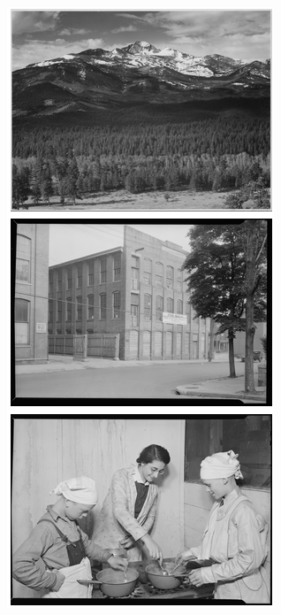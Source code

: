 \begin{enumerate}
\begin{figure}[htb]
	\centering
	\begin{subfigure}[b]{0.4\linewidth}
		\includegraphics[width=\linewidth]{img/ColourisationOriginal.png}

\end{subfigure}
\end{figure}
\end{enumerate}
